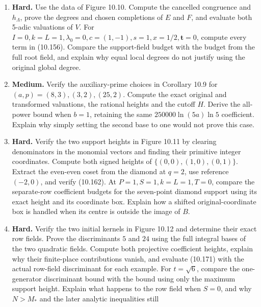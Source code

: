 \documentclass[
  11pt,
  a4paper,
]{article}
\begin{document}
\begin{enumerate}
  lie outside \(\mathbb Q\), whereas every normalized row entry is
  rational. Determine \(N,M_*,H_{\mathrm{ph}}\), and check the vector
  \((-b,C,-C,b)\) at all three nodes. Factor its torus polynomial,
  compute its two projective heights and its minimum 5-adic coefficient
  valuation, and compare its height with (10.152). Explain why the zero
  first row does not invalidate the bound.
\item
  \textbf{Hard.} Use the data of Figure 10.10. Compute the cancelled
  congruence and \(h_\Lambda\), prove the degrees and chosen completions
  of \(E\) and \(F\), and evaluate both 5-adic valuations of \(V\). For
  \(I=0,k=L=1,\lambda_0=0,c=(1,-1),s=1,x=1/2,\boldsymbol t=0\), compute
  every term in (10.156). Compare the support-field budget with the
  budget from the full root field, and explain why equal local degrees
  do not justify using the original global degree.
\item
  \textbf{Medium.} Verify the auxiliary-prime choices in Corollary 10.9
  for \((a,p)=(8,3),(3,2),(25,2)\). Compute the exact original and
  transformed valuations, the rational heights and the cutoff \(H\).
  Derive the all-power bound when \(b=1\), retaining the same
  \(250000\ln(5a)\ln5\) coefficient. Explain why simply setting the
  second base to one would not prove this case.
\item
  \textbf{Hard.} Verify the two support heights in Figure 10.11 by
  clearing denominators in the monomial vectors and finding their
  primitive integer coordinates. Compute both signed heights of
  \(\{(0,0),(1,0),(0,1)\}\). Extract the even-even coset from the
  diamond at \(q=2\), use reference \((-2,0)\), and verify (10.162). At
  \(P=1,S=1,k=L=1,T=0\), compare the separate-row coefficient budgets
  for the seven-point diamond support using its exact height and its
  coordinate box. Explain how a shifted original-coordinate box is
  handled when its centre is outside the image of \(B\).
\item
  \textbf{Hard.} Verify the two initial kernels in Figure 10.12 and
  determine their exact row fields. Prove the discriminants \(5\) and
  \(24\) using the full integral bases of the two quadratic fields.
  Compute both projective coefficient heights, explain why their
  finite-place contributions vanish, and evaluate (10.171) with the
  actual row-field discriminant for each example. For \(t=\sqrt6\),
  compare the one-generator discriminant bound with the bound using only
  the maximum support height. Explain what happens to the row field when
  \(S=0\), and why \(N>M_*\) and the later analytic inequalities still

\end{enumerate}
\end{document}
